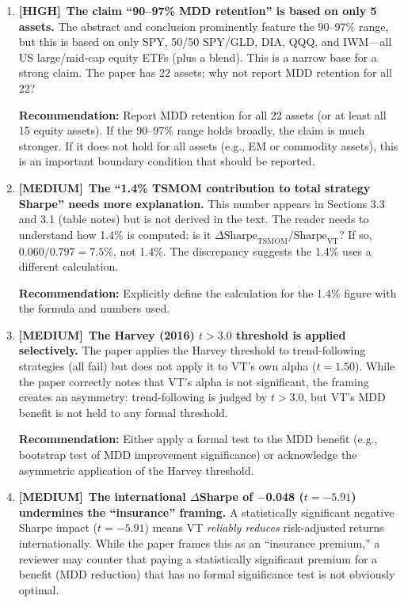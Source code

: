 \documentclass[12pt,a4paper]{article}
\newcommand{\HIGH}{\textcolor{highsev}{\textbf{[HIGH]}}}
\newcommand{\MEDIUM}{\textcolor{medsev}{\textbf{[MEDIUM]}}}
\begin{document}
\begin{enumerate}[label=\textbf{9.\arabic*}]

\item \HIGH\ \textbf{The claim ``90--97\% MDD retention'' is based on only 5 assets.}
The abstract and conclusion prominently feature the 90--97\% range, but this is based on only SPY, 50/50 SPY/GLD, DIA, QQQ, and IWM---all US large/mid-cap equity ETFs (plus a blend). This is a narrow base for a strong claim. The paper has 22 assets; why not report MDD retention for all 22?

\textbf{Recommendation:} Report MDD retention for all 22 assets (or at least all 15 equity assets). If the 90--97\% range holds broadly, the claim is much stronger. If it does not hold for all assets (e.g., EM or commodity assets), this is an important boundary condition that should be reported.

\item \MEDIUM\ \textbf{The ``1.4\% TSMOM contribution to total strategy Sharpe'' needs more explanation.}
This number appears in Sections 3.3 and 3.1 (table notes) but is not derived in the text. The reader needs to understand how 1.4\% is computed: is it $\Delta\text{Sharpe}_{\text{TSMOM}} / \text{Sharpe}_{\text{VT}}$? If so, $0.060 / 0.797 = 7.5\%$, not 1.4\%. The discrepancy suggests the 1.4\% uses a different calculation.

\textbf{Recommendation:} Explicitly define the calculation for the 1.4\% figure with the formula and numbers used.

\item \MEDIUM\ \textbf{The Harvey (2016) $t > 3.0$ threshold is applied selectively.}
The paper applies the Harvey threshold to trend-following strategies (all fail) but does not apply it to VT's own alpha ($t = 1.50$). While the paper correctly notes that VT's alpha is not significant, the framing creates an asymmetry: trend-following is judged by $t > 3.0$, but VT's MDD benefit is not held to any formal threshold.

\textbf{Recommendation:} Either apply a formal test to the MDD benefit (e.g., bootstrap test of MDD improvement significance) or acknowledge the asymmetric application of the Harvey threshold.

\item \MEDIUM\ \textbf{The international $\Delta$Sharpe of $-$0.048 ($t = -5.91$) undermines the ``insurance'' framing.}
A statistically significant negative Sharpe impact ($t = -5.91$) means VT \textit{reliably reduces} risk-adjusted returns internationally. While the paper frames this as an ``insurance premium,'' a reviewer may counter that paying a statistically significant premium for a benefit (MDD reduction) that has no formal significance test is not obviously optimal.


\end{enumerate}
\end{document}
